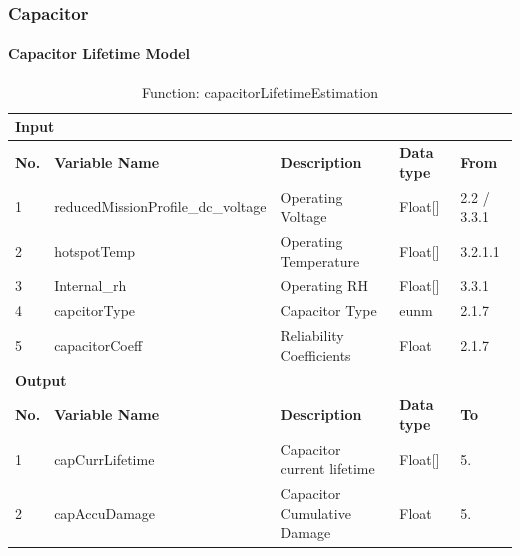 \documentclass{article}
\begin{document}
\subsubsection{Capacitor}
\paragraph{Capacitor Lifetime Model}
\begin{table}[h]
\centering
\caption{Function: capacitorLifetimeEstimation}
\begin{tabular}{|l|l|l|l|l|}
\hline
\multicolumn{5}{|l|}{\textbf{Input}} \\ \hline
\textbf{No.} & \textbf{Variable Name} & \textbf{Description} & \textbf{Data type} & \textbf{From} \\ \hline
1 & reducedMissionProfile\_dc\_voltage & Operating Voltage & Float[] & 2.2 / 3.3.1 \\ \hline
2 & hotspotTemp & Operating Temperature & Float[] & 3.2.1.1 \\ \hline
3 & Internal\_rh & Operating RH & Float[] & 3.3.1 \\ \hline
4 & capcitorType & Capacitor Type & eunm & 2.1.7 \\ \hline
5 & capacitorCoeff & Reliability Coefficients & Float & 2.1.7 \\ \hline
\multicolumn{5}{|l|}{\textbf{Output}} \\ \hline
\textbf{No.} & \textbf{Variable Name} & \textbf{Description} & \textbf{Data type} & \textbf{To} \\ \hline
1 & capCurrLifetime & Capacitor current lifetime & Float[] & 5. \\ \hline
2 & capAccuDamage & Capacitor Cumulative Damage & Float & 5. \\ \hline
\end{tabular}
\end{table}
\end{document}
